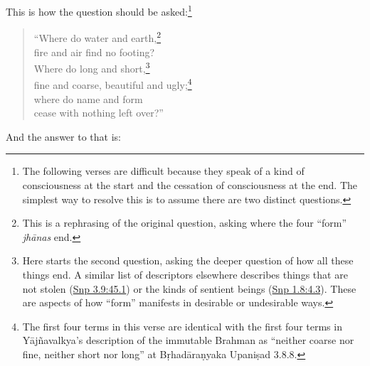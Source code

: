 \documentclass[12pt,openany]{book}%
\begin{document}
This is how the question should be asked:\footnote{The following verses are difficult because they speak of a kind of consciousness at the start and the cessation of consciousness at the end. The simplest way to resolve this is to assume there are two distinct questions. } 

\begin{verse}%
“Where do water and earth,\footnote{This is a rephrasing of the original question, asking where the four “form” \textit{\textsanskrit{jhānas}} end. } \\
fire and air find no footing? \\
Where do long and short,\footnote{Here starts the second question, asking the deeper question of how all these things end. A similar list of descriptors elsewhere describes things that are not stolen (\href{https://suttacentral.net/snp3.9/en/sujato\#45.1}{Snp 3.9:45.1}) or the kinds of sentient beings (\href{https://suttacentral.net/snp1.8/en/sujato\#4.3}{Snp 1.8:4.3}). These are aspects of how “form” manifests in desirable or undesirable ways. } \\
fine and coarse, beautiful and ugly;\footnote{The first four terms in this verse are identical with the first four terms in \textsanskrit{Yājñavalkya}’s description of the immutable Brahman as “neither coarse nor fine, neither short nor long” at \textsanskrit{Bṛhadāraṇyaka} \textsanskrit{Upaniṣad} 3.8.8. } \\
where do name and form \\
cease with nothing left over?” 

%
\end{verse}

And the answer to that is: 
\end{document}
